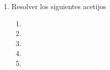 \documentclass[a4paper]{article}
\makeatletter
\newcommand{\exercise}{\item}
\newcommand{\img}[2]{ \begin{minipage}[t]{\linewidth} \raisebox{-\height}{\texttt{[image: \#2]}} \end{minipage} }
\newenvironment{amatrix}[1]{%
  \left(\begin{array}{@{}*{#1}{c}|c@{}}
}{%
  \end{array}\right)
}
\makeatother
\begin{document}
\begin{enumerate}
\begin{multicols}{2}
\begin{enumerate} [label=(\alph*)]
		\item $\begin{amatrix}{2} 1 & 0 & 4 \\ 0 & 0 & 0 \end{amatrix}$
		\item $\begin{amatrix}{3} 1 & -2 & 0 & 7 \\ 0 & 3 & 1 & -5 \\ 0 & 0 & 0 & 0 \end{amatrix}$
		\item $\begin{amatrix}{3} 1 & 0 & -1 & 7 \\ 0 & 1 & 2 & 0 \\ 0 & 0 & 0 & 0 \\ 0 & 0 & 0 & 0 \end{amatrix}$
		\item $\begin{amatrix}{4} 1 & -2 & 0 & 0 & -6 \\ 0 & 0 & 1 & 0 & 2 \\ 0 & 0 & 0 & 1 & 0 \end{amatrix}$
		\item $\begin{amatrix}{4} 1 & -1 & 2 & 3 & -2 \\ 0 & 0 & 0 & 0 & 3 \\ 0 & 0 & 0 & 0 & 0 \end{amatrix}$
		\item $\begin{amatrix}{4} 1 & 0 & 0 & -1 & \frac{1}{2} \\ 0 & 0 & 1 & \frac{3}{4} & 2 \\ 0 & 0 & 0 & 0 & 0 \end{amatrix}$
	\end{enumerate}
	\end{multicols}
	\exercise Resolver los siguientes acetijos
	\begin{multicols}{2}
		\begin{enumerate}[label=(\alph*)]
			\item \img{1.05\textwidth}{img/table_puzzle.png}
			\item \img{\textwidth}{img/fruit_puzzle.png}
			\item \img{0.6\textwidth}{img/square_puzzle.png}
			\item \img{\textwidth}{img/fruit_puzzle2.png}
			\item \img{\textwidth}{img/weight_puzzle.png}
		\end{enumerate}

\end{multicols}
\end{enumerate}
\end{document}
